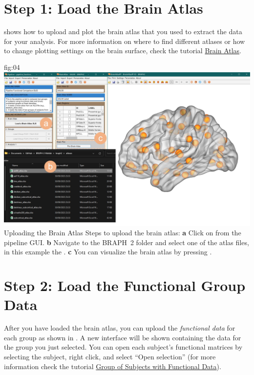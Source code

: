 \documentclass[justified]{tufte-handout}
\begin{document}

\clearpage
\section{Step 1: Load the Brain Atlas}

 shows how to upload and plot the brain atlas that you used to extract the data for your analysis. For more information on where to find different atlases or how to change plotting settings on the brain surface, check the tutorial \href{https://github.com/braph-software/BRAPH-2/tree/develop/tutorials/data/tut_ba}{Brain Atlas}.

	{fig:04}
	{
	\includegraphics{fig04.jpg}
	}
	{Uploading the Brain Atlas}
	{
	Steps to upload the brain atlas:
	{\bf a} Click on  from the pipeline GUI.
	{\bf b} Navigate to the BRAPH~2 folder  and select one of the atlas files, in this example the . 
	{\bf c} You can visualize the brain atlas by pressing . 
	}

	
\clearpage
\section{Step 2: Load the Functional Group Data}

After you have loaded the brain atlas, you can upload the \emph{functional data} for each group as shown in . A new interface will be shown containing the data for the group you just selected. You can open each subject’s functional matrices by selecting the subject, right click, and select “Open selection” (for more information check the tutorial \href{https://github.com/braph-software/BRAPH-2/tree/develop/tutorials/data/tut_gr_fun}{Group of Subjects with Functional Data}).
\end{document}
